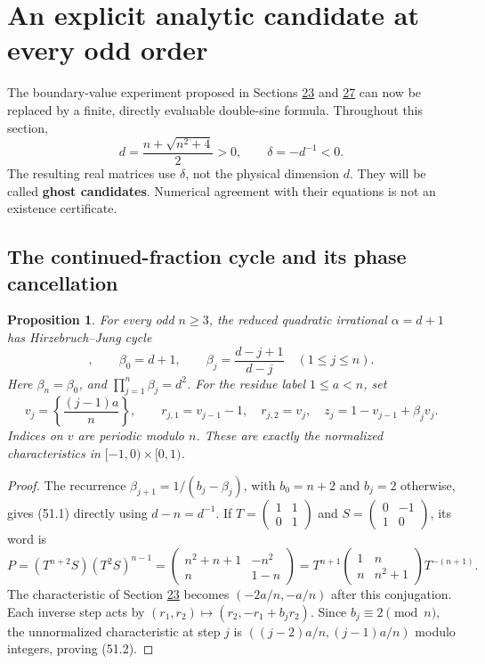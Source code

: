 \documentclass[11pt,reqno]{amsart}
\theoremstyle{plain}
\newtheorem{proposition}[theorem]{Proposition}
\begin{document}
\section{An explicit analytic candidate at every odd order}\label{sec:51}

The boundary-value experiment proposed in Sections \hyperref[sec:23]{23} and \hyperref[sec:27]{27} can now be
replaced by a finite, directly evaluable double-sine formula. Throughout
this section,
\[
 d=\frac{n+\sqrt{n^2+4}}2>0,\qquad \delta=-d^{-1}<0.
\]
The resulting real matrices use \(\delta\), not the physical dimension
\(d\). They will be called \textbf{ghost candidates}. Numerical agreement with
their equations is not an existence certificate.

\subsection{The continued-fraction cycle and its phase cancellation}\label{sec:51.1}

\begin{proposition}
For every odd \(n\ge3\), the reduced quadratic irrational
\(\alpha=d+1\) has Hirzebruch--Jung cycle
\begin{equation*}
 [\overline{n+2,\underbrace{2,\ldots,2}_{n-1}}],\qquad
 \beta_0=d+1,\qquad
 \beta_j=\frac{d-j+1}{d-j}\quad(1\le j\le n).
 \tag{51.1}
\end{equation*}
Here \(\beta_n=\beta_0\), and \(\prod_{j=1}^n\beta_j=d^2\).
For the residue label \(1\le a<n\), set
\begin{equation*}
 v_j=\left\{\frac{(j-1)a}{n}\right\},\qquad
 r_{j,1}=v_{j-1}-1,\quad r_{j,2}=v_j,\quad
 z_j=1-v_{j-1}+\beta_jv_j.
 \tag{51.2}
\end{equation*}
Indices on \(v\) are periodic modulo \(n\). These are exactly the
normalized characteristics in \([-1,0)\times[0,1)\).
\end{proposition}

\begin{proof}
The recurrence \(\beta_{j+1}=1/(b_j-\beta_j)\), with
\(b_0=n+2\) and \(b_j=2\) otherwise, gives (51.1) directly using
\(d-n=d^{-1}\). If \(T=\left(\begin{smallmatrix}1&1\\0&1\end{smallmatrix}\right)\)
and \(S=\left(\begin{smallmatrix}0&-1\\1&0\end{smallmatrix}\right)\), its word is
\[
 P=(T^{n+2}S)(T^2S)^{n-1}
 =\begin{pmatrix}n^2+n+1&-n^2\\n&1-n\end{pmatrix}
 =T^{n+1}\begin{pmatrix}1&n\\n&n^2+1\end{pmatrix}T^{-(n+1)}.
\]
The characteristic of Section \hyperref[sec:23]{23} becomes
\((-2a/n,-a/n)\) after this conjugation. Each inverse step acts by
\((r_1,r_2)\mapsto(r_2,-r_1+b_jr_2)\). Since \(b_j\equiv2\pmod n\),
the unnormalized characteristic at step \(j\) is
\(((j-2)a/n,(j-1)a/n)\) modulo integers, proving (51.2).
\end{proof}
\end{document}
